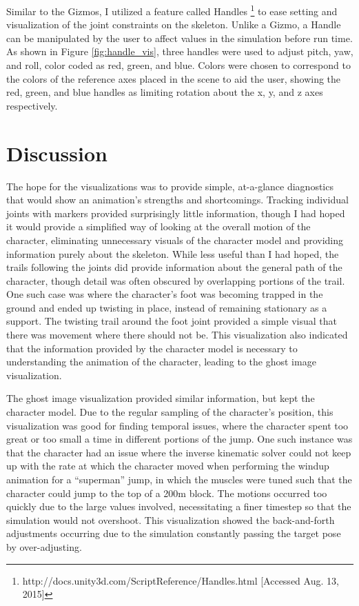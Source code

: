 Similar to the Gizmos, I utilized a feature called Handles \footnote{http://docs.unity3d.com/ScriptReference/Handles.html [Accessed Aug. 13, 2015]} to ease setting and visualization of the joint constraints on the skeleton.  Unlike a Gizmo, a Handle can be manipulated by the user to affect values in the simulation before run time.  As shown in Figure \ref{fig:handle_vis}, three handles were used to adjust pitch, yaw, and roll, color coded as red, green, and blue.  Colors were chosen to correspond to the colors of the reference axes placed in the scene to aid the user, showing the red, green, and blue handles as limiting rotation about the x, y, and z axes respectively.

\section{Discussion}
\label{section:vis_discussion}
The hope for the visualizations was to provide simple, at-a-glance diagnostics that would show an animation's strengths and shortcomings.  Tracking individual joints with markers provided surprisingly little information, though I had hoped it would provide a simplified way of looking at the overall motion of the character, eliminating unnecessary visuals of the character model and providing information purely about the skeleton.  While less useful than I had hoped, the trails following the joints did provide information about the general path of the character, though detail was often obscured by overlapping portions of the trail. One such case was where the character's foot was becoming trapped in the ground and ended up twisting in place, instead of remaining stationary as a support.  The twisting trail around the foot joint provided a simple visual that there was movement where there should not be.  This visualization also indicated that the information provided by the character model is necessary to understanding the animation of the character, leading to the ghost image visualization.

The ghost image visualization provided similar information, but kept the character model.   Due to the regular sampling of the character's position, this visualization was good for finding temporal issues, where the character spent too great or too small a time in different portions of the jump.  One such instance was that the character had an issue where the inverse kinematic solver could not keep up with the rate at which the character moved when performing the windup animation for a ``superman'' jump, in which the muscles were tuned such that the character could jump to the top of a 200m block.  The motions occurred too quickly due to the large values involved, necessitating a finer timestep so that the simulation would not overshoot.  This visualization showed the back-and-forth adjustments occurring due to the simulation constantly passing the target pose by over-adjusting.


